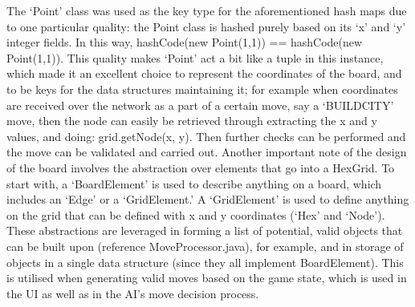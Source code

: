 \documentclass[a4paper,doc,draftfirst]{apa6}
\begin{document}
The ‘Point’ class was used as the key type for the aforementioned hash maps due to one particular quality: the Point class is hashed purely based on its ‘x’ and ‘y’ integer fields. In this way, hashCode(new Point(1,1)) == hashCode(new Point(1,1)). This quality makes ‘Point’ act a bit like a tuple in this instance, which made it an excellent choice to represent the coordinates of the board, and to be keys for the data structures maintaining it; for example when coordinates are received over the network as a part of a certain move, say a ‘BUILDCITY’ move, then the node can easily be retrieved through extracting the x and y values, and doing: grid.getNode(x, y). Then further checks can be performed and the move can be validated and carried out. Another important note of the design of the board involves the abstraction over elements that go into a HexGrid. To start with, a ‘BoardElement’ is used to describe anything on a board, which includes an ‘Edge’ or a ‘GridElement.’ A ‘GridElement’ is used to define anything on the grid that can be defined with x and y coordinates (‘Hex’ and ‘Node’). These abstractions are leveraged in forming a list of potential, valid objects that can be built upon (reference MoveProcessor.java), for example, and in storage of objects in a single data structure (since they all implement BoardElement). This is utilised when generating valid moves based on the game state, which is used in the UI as well as in the AI’s move decision process.
\end{document}
